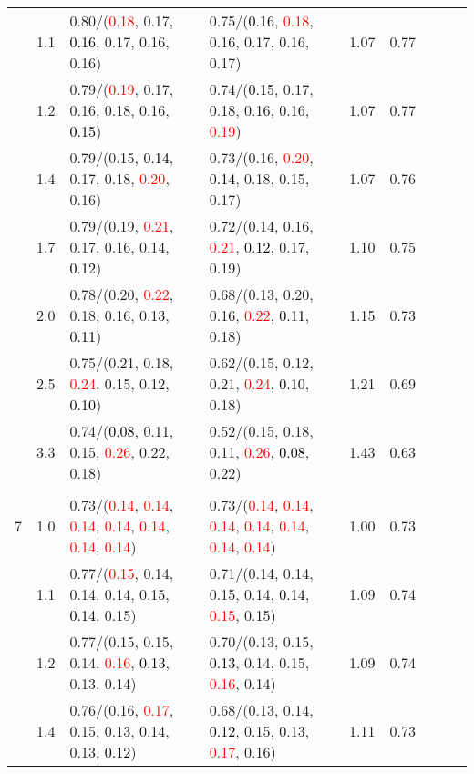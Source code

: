 \documentclass[10pt,a4paper]{report}
\begin{document}
\begin{table}[!htbp]
\begin{center}
{\begin{tabular}{ccllccccc}
			&1.1&0.80/(\textcolor{red}{0.18}, 0.17, \textcolor{black}{0.16}, 0.17, 0.16, 0.16)&0.75/(\textcolor{black}{0.16}, \textcolor{red}{0.18}, 0.16, 0.17, 0.16, 0.17)&1.07&0.77\\
			&1.2&0.79/(\textcolor{red}{0.19}, 0.17, 0.16, 0.18, 0.16, \textcolor{black}{0.15})&0.74/(\textcolor{black}{0.15}, 0.17, 0.18, 0.16, 0.16, \textcolor{red}{0.19})&1.07&0.77\\
			&1.4&0.79/(0.15, \textcolor{black}{0.14}, 0.17, 0.18, \textcolor{red}{0.20}, 0.16)&0.73/(0.16, \textcolor{red}{0.20}, \textcolor{black}{0.14}, 0.18, 0.15, 0.17)&1.07&0.76\\
			&1.7&0.79/(0.19, \textcolor{red}{0.21}, 0.17, 0.16, 0.14, \textcolor{black}{0.12})&0.72/(0.14, 0.16, \textcolor{red}{0.21}, \textcolor{black}{0.12}, 0.17, 0.19)&1.10&0.75\\
			&2.0&0.78/(0.20, \textcolor{red}{0.22}, 0.18, 0.16, 0.13, \textcolor{black}{0.11})&0.68/(0.13, 0.20, 0.16, \textcolor{red}{0.22}, \textcolor{black}{0.11}, 0.18)&1.15&0.73\\
			&2.5&0.75/(0.21, 0.18, \textcolor{red}{0.24}, 0.15, 0.12, \textcolor{black}{0.10})&0.62/(0.15, 0.12, 0.21, \textcolor{red}{0.24}, \textcolor{black}{0.10}, 0.18)&1.21&0.69\\
			&3.3&0.74/(\textcolor{black}{0.08}, 0.11, 0.15, \textcolor{red}{0.26}, 0.22, 0.18)&0.52/(0.15, 0.18, 0.11, \textcolor{red}{0.26}, \textcolor{black}{0.08}, 0.22)&1.43&0.63\\
			&&&&\\
			7			&1.0&0.73/(\textcolor{red}{0.14}, \textcolor{red}{0.14}, \textcolor{red}{0.14}, \textcolor{red}{0.14}, \textcolor{red}{0.14}, \textcolor{red}{0.14}, \textcolor{red}{0.14})&0.73/(\textcolor{red}{0.14}, \textcolor{red}{0.14}, \textcolor{red}{0.14}, \textcolor{red}{0.14}, \textcolor{red}{0.14}, \textcolor{red}{0.14}, \textcolor{red}{0.14})&1.00&0.73\\
			&1.1&0.77/(\textcolor{red}{0.15}, 0.14, 0.14, 0.14, 0.15, \textcolor{black}{0.14}, 0.15)&0.71/(0.14, 0.14, 0.15, 0.14, \textcolor{black}{0.14}, \textcolor{red}{0.15}, 0.15)&1.09&0.74\\
			&1.2&0.77/(0.15, 0.15, 0.14, \textcolor{red}{0.16}, \textcolor{black}{0.13}, 0.13, 0.14)&0.70/(0.13, 0.15, \textcolor{black}{0.13}, 0.14, 0.15, \textcolor{red}{0.16}, 0.14)&1.09&0.74\\
			&1.4&0.76/(0.16, \textcolor{red}{0.17}, 0.15, 0.13, 0.14, 0.13, \textcolor{black}{0.12})&0.68/(0.13, 0.14, \textcolor{black}{0.12}, 0.15, 0.13, \textcolor{red}{0.17}, 0.16)&1.11&0.73\\

\end{tabular}}
\end{center}
\end{table}
\end{document}
